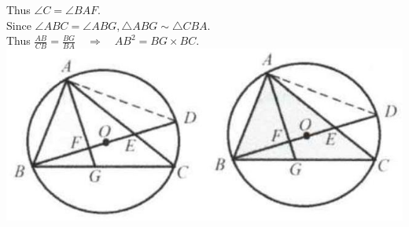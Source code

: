 \documentclass{article}
\begin{document}
Thus \(\angle C=\angle B A F\).\\
Since \(\angle A B C=\angle A B G, \triangle A B G \sim \triangle C B A\).\\
Thus \(\frac{A B}{C B}=\frac{B G}{B A} \quad \Rightarrow \quad A B^{2}=B G \times B C\).\\
\centering
\includegraphics[width=\textwidth]{images/166.jpg}
\end{document}
